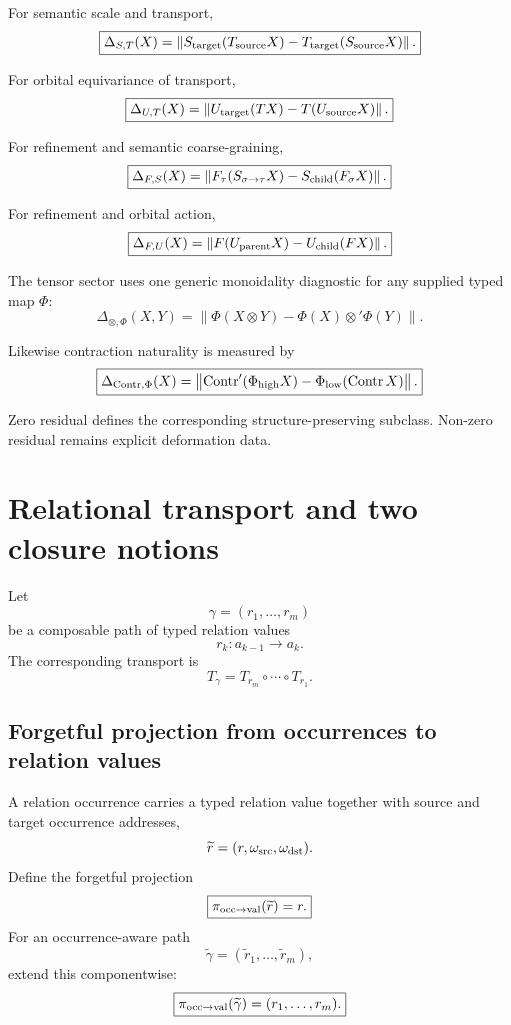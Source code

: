 \documentclass[11pt]{article}
\begin{document}
For semantic scale and transport,
\[
\boxed{
\Delta_{S,T}(X)
=
\left\|
S_{\rm target}(T_{\rm source}X)
-
T_{\rm target}(S_{\rm source}X)
\right\|.
}
\]

For orbital equivariance of transport,
\[
\boxed{
\Delta_{U,T}(X)
=
\left\|
U_{\rm target}(TX)-T(U_{\rm source}X)
\right\|.
}
\]

For refinement and semantic coarse-graining,
\[
\boxed{
\Delta_{F,S}(X)
=
\left\|
F_{\tau}(S_{\sigma\to\tau}X)
-
S_{\rm child}(F_{\sigma}X)
\right\|.
}
\]

For refinement and orbital action,
\[
\boxed{
\Delta_{F,U}(X)
=
\left\|
F(U_{\rm parent}X)
-
U_{\rm child}(FX)
\right\|.
}
\]

The tensor sector uses one generic monoidality diagnostic for any supplied
typed map \(\Phi\):
\[
\boxed{
\Delta_{\otimes,\Phi}(X,Y)
=
\left\|
\Phi(X\otimes Y)
-
\Phi(X)\otimes'\Phi(Y)
\right\|.
}
\]

Likewise contraction naturality is measured by
\[
\boxed{
\Delta_{\operatorname{Contr},\Phi}(X)
=
\left\|
\operatorname{Contr}'(\Phi_{\rm high}X)
-
\Phi_{\rm low}(\operatorname{Contr}X)
\right\|.
}
\]

Zero residual defines the corresponding structure-preserving subclass.
Non-zero residual remains explicit deformation data.

\section{Relational transport and two closure notions}

Let
\[
\gamma=(r_1,\ldots,r_m)
\]
be a composable path of typed relation values
\[
r_k:a_{k-1}\to a_k.
\]
The corresponding transport is
\[
\boxed{
T_{\gamma}
=
T_{r_m}\circ\cdots\circ T_{r_1}.
}
\]

\subsection{Forgetful projection from occurrences to relation values}

A relation occurrence carries a typed relation value together with source and
target occurrence addresses,
\[
\widetilde r
=
(r,\omega_{\rm src},\omega_{\rm dst}).
\]
Define the forgetful projection
\[
\boxed{
\pi_{\rm occ\to val}
(\widetilde r)
=
r.
}
\]
For an occurrence-aware path
\[
\widetilde\gamma
=
(\widetilde r_1,\ldots,\widetilde r_m),
\]
extend this componentwise:
\[
\boxed{
\pi_{\rm occ\to val}
(\widetilde\gamma)
=
(r_1,\ldots,r_m).
}
\]
\end{document}
